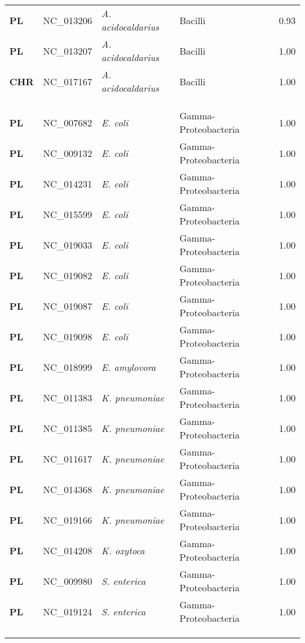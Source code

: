 \begin{adjustwidth}{-3cm}{2cm}
{\begin{supertabular}{>{\bfseries}l|p{0.1\textwidth}p{0.14\textwidth}l|l}
PL & NC\_013206 & \textit{A. acidocaldarius} & Bacilli & 0.93\\
PL & NC\_013207 & \textit{A. acidocaldarius} & Bacilli & 1.00\\
CHR & NC\_017167 & \textit{A. acidocaldarius} & Bacilli & 1.00\\
\\
\\
\hline\\
PL & NC\_007682 & \textit{E. coli} & Gamma-Proteobacteria & 1.00\\
PL & NC\_009132 & \textit{E. coli} & Gamma-Proteobacteria & 1.00\\
PL & NC\_014231 & \textit{E. coli} & Gamma-Proteobacteria & 1.00\\
PL & NC\_015599 & \textit{E. coli} & Gamma-Proteobacteria & 1.00\\
PL & NC\_019033 & \textit{E. coli} & Gamma-Proteobacteria & 1.00\\
PL & NC\_019082 & \textit{E. coli} & Gamma-Proteobacteria & 1.00\\
PL & NC\_019087 & \textit{E. coli} & Gamma-Proteobacteria & 1.00\\
PL & NC\_019098 & \textit{E. coli} & Gamma-Proteobacteria & 1.00\\
PL & NC\_018999 & \textit{E. amylovora} & Gamma-Proteobacteria & 1.00\\
PL & NC\_011383 & \textit{K. pneumoniae} & Gamma-Proteobacteria & 1.00\\
PL & NC\_011385 & \textit{K. pneumoniae} & Gamma-Proteobacteria & 1.00\\
PL & NC\_011617 & \textit{K. pneumoniae} & Gamma-Proteobacteria & 1.00\\
PL & NC\_014368 & \textit{K. pneumoniae} & Gamma-Proteobacteria & 1.00\\
PL & NC\_019166 & \textit{K. pneumoniae} & Gamma-Proteobacteria & 1.00\\
PL & NC\_014208 & \textit{K. oxytoca} & Gamma-Proteobacteria & 1.00\\
PL & NC\_009980 & \textit{S. enterica} & Gamma-Proteobacteria & 1.00\\
PL & NC\_019124 & \textit{S. enterica} & Gamma-Proteobacteria & 1.00\\
\\
\\
\hline\\

\end{supertabular}}
\end{adjustwidth}
